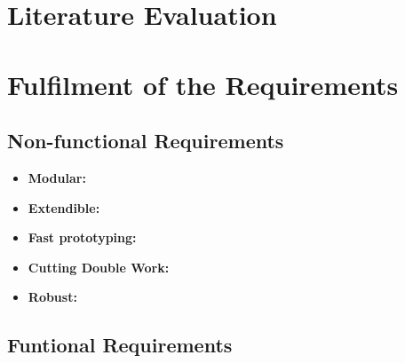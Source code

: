 \section{Literature Evaluation}


\section{Fulfilment of the Requirements}

\subsection{Non-functional Requirements}
\begin{itemize}
	\item \textbf{Modular:} 
	\item \textbf{Extendible:} 
	\item \textbf{Fast prototyping:} 
	\item \textbf{Cutting Double Work:} 
	\item \textbf{Robust:} 

\end{itemize}

\subsection{Funtional Requirements}
